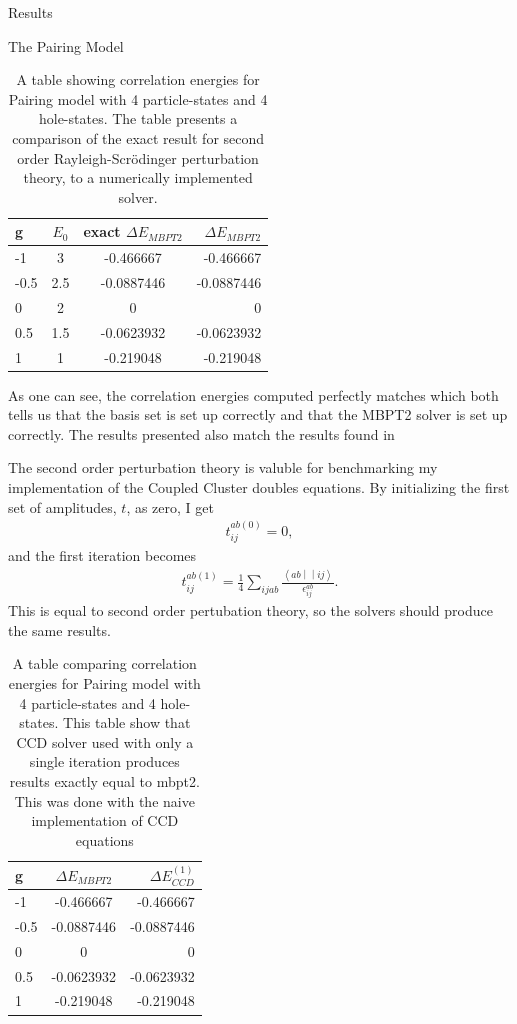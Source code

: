 \documentclass[twoside,english]{uiofysmaster}
\begin{document}
\begin{chapter}{Results}
\begin{section}{The Pairing Model}
		\begin{table}[H]
			\begin{center}
				\begin{tabular}[center]{l | c | c | r}
					g & $E_0$ & exact $ \Delta E_{MBPT2}$  & $\Delta E_{MBPT2}$ \\
					\hline
					-1 & 3 & -0.466667 & -0.466667 \\
					-0.5 & 2.5 & -0.0887446 & -0.0887446 \\
					0 & 2 & 0 & 0 \\
					0.5 & 1.5 & -0.0623932 & -0.0623932 \\
					1 & 1 & -0.219048 & -0.219048
				\end{tabular}
			\end{center}
			\caption{A table showing correlation energies for Pairing model with 4 particle-states and 4 hole-states. The table presents a comparison of the exact result for second order Rayleigh-Scr\"{o}dinger perturbation theory, to a numerically implemented solver. }
			\label{Results1}
		\end{table}
		As one can see, the correlation energies computed perfectly matches which both tells us that the basis set is set up correctly and that the MBPT2 solver is set up correctly. The results presented also match the results found in \cite{Hjorth-Jensen2016}

		The second order perturbation theory is valuble for benchmarking my implementation of the Coupled Cluster doubles equations. By initializing the first set of amplitudes, $t$, as zero, I get
		\begin{align}
			t_{ij}^{ab(0)} = 0 , 
		\end{align}
		and the first iteration becomes 
		\begin{align}
			t_{ij}^{ab(1)} = \frac{1}{4} \sum_{ijab} \frac{\left<ab\middle|\middle|ij\right>}{\epsilon_{ij}^{ab}} .
 		\end{align}
 		This is equal to second order pertubation theory, so the solvers should produce the same results.
 		\begin{table}[H]
			\begin{center}
				\begin{tabular}[center]{l | c | r}
					g & $ \Delta E_{MBPT2}$  & $\Delta E_{CCD}^{(1)}$ \\
					\hline
					-1 & -0.466667 & -0.466667 \\
					-0.5 & -0.0887446 & -0.0887446 \\
					0 & 0 & 0 \\
					0.5 & -0.0623932 & -0.0623932 \\
					1 & -0.219048 & -0.219048
				\end{tabular}
			\end{center}
			\caption{A table comparing correlation energies for Pairing model with 4 particle-states and 4 hole-states. This table show that CCD solver used with only a single iteration produces results exactly equal to mbpt2. This was done with the naive implementation of CCD equations}
			\label{Results2}
		\end{table}
		


\end{section}
\end{chapter}
\end{document}
